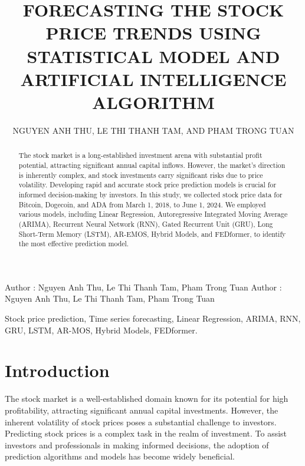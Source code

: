 \documentclass{ieeeojies}
\begin{document}
\title{FORECASTING THE STOCK PRICE TRENDS USING STATISTICAL MODEL AND ARTIFICIAL INTELLIGENCE ALGORITHM}

\author{\uppercase{Nguyen Anh Thu},
\uppercase{Le Thi Thanh Tam, and Pham Trong Tuan}}


\address[1]{Faculty of Information Systems, University of Information Technology, (e-mail: 21522647@gm.uit.edu.vn)}
\address[2]{Faculty of Information Systems, University of Information Technology, (e-mail: 21522825@gm.uit.edu.vn)}
\address[3]{Faculty of Information Systems, University of Information Technology, (e-mail: 21521636@gm.uit.edu.vn)}

\markboth
{Author \headeretal: Nguyen Anh Thu, Le Thi Thanh Tam, Pham Trong Tuan}
{Author \headeretal: Nguyen Anh Thu, Le Thi Thanh Tam, Pham Trong Tuan}



\begin{abstract}
The stock market is a long-established investment arena with substantial profit potential, attracting significant annual capital inflows. However, the market's direction is inherently complex, and stock investments carry significant risks due to price volatility. Developing rapid and accurate stock price prediction models is crucial for informed decision-making by investors. In this study, we collected stock price data for Bitcoin, Dogecoin, and ADA from March 1, 2018, to June 1, 2024. We employed various models, including Linear Regression, Autoregressive Integrated Moving Average (ARIMA), Recurrent Neural Network (RNN), Gated Recurrent Unit (GRU), Long Short-Term Memory (LSTM), AR-EMOS, Hybrid Models, and FEDformer, to identify the most effective prediction model.
\end{abstract}

\begin{keywords}
Stock price prediction, Time series forecasting, Linear Regression, ARIMA, RNN, GRU, LSTM, AR-MOS, Hybrid Models, FEDformer.
\end{keywords}


\titlepgskip=-15pt

\maketitle

\section{Introduction}
\label{sec:introduction}
The stock market is a well-established domain known for its potential for high profitability, attracting significant annual capital investments. However, the inherent volatility of stock prices poses a substantial challenge to investors. Predicting stock prices is a complex task in the realm of investment. To assist investors and professionals in making informed decisions, the adoption of prediction algorithms and models has become widely beneficial.
\end{document}
